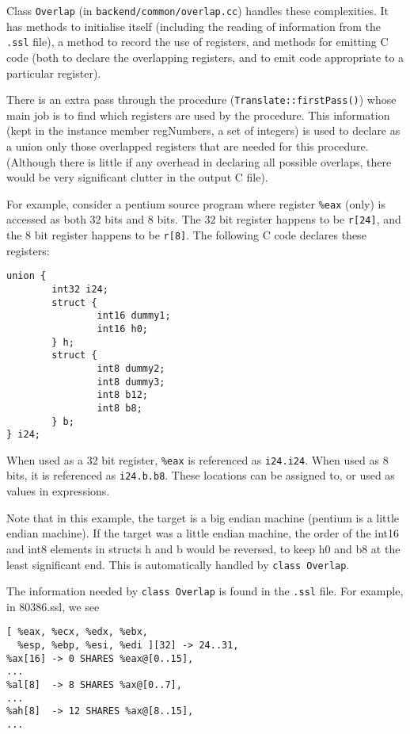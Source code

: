 Class \texttt{Overlap} (in \texttt{backend/common/overlap.cc}) handles these
complexities. It has methods to initialise itself (including the reading
of information from the \texttt{.ssl} file),
a method to record the use of registers, and methods for emitting C code
(both to declare the overlapping registers, and to emit code appropriate to
a particular register).

There is an extra pass through the procedure (\texttt{Translate::firstPass()})
whose main job is to find which registers are used by the procedure. This
information (kept in the instance member regNumbers, a set of integers) is
used to declare as a union only those overlapped registers that are needed
for this procedure. (Although there is little if any overhead in declaring
all possible overlaps, there would be very significant clutter in the output C
file).

For example, consider a pentium source program where register \texttt{\%eax}
(only) is accessed as both 32 bits and 8 bits. The 32 bit register happens
to be \texttt{r[24]}, and the 8 bit register happens to be \texttt{r[8]}.
The following C code declares these registers:
\begin{verbatim}
union {
        int32 i24;
        struct {
                int16 dummy1;
                int16 h0;
        } h;
        struct {
                int8 dummy2;
                int8 dummy3;
                int8 b12;
                int8 b8;
        } b;
} i24;
\end{verbatim}
When used as a 32 bit register, \texttt{\%eax} is referenced as
\texttt{i24.i24}. When used as 8 bits, it is referenced as
\texttt{i24.b.b8}. These locations can be assigned to, or used as values
in expressions.

Note that in this example, the target is a big endian machine (pentium is a
little endian machine). If the target was a little endian machine, the order
of the int16 and int8 elements in structs h and b would be reversed, to keep
h0 and b8 at the least significant end. This is automatically handled by
\texttt{class Overlap}.

The information needed by \texttt{class Overlap} is found in the \texttt{.ssl}
file. For example, in 80386.ssl, we see
\begin{verbatim}
[ %eax, %ecx, %edx, %ebx,
  %esp, %ebp, %esi, %edi ][32] -> 24..31,
%ax[16] -> 0 SHARES %eax@[0..15],
...
%al[8]  -> 8 SHARES %ax@[0..7],
...
%ah[8]  -> 12 SHARES %ax@[8..15],
...
\end{verbatim}


